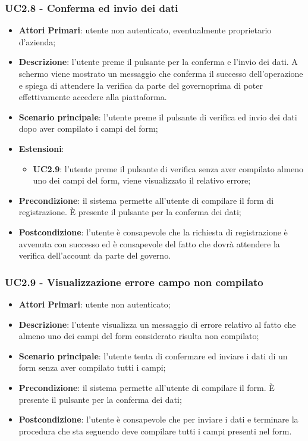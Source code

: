 \subsubsection{UC2.8 - Conferma ed invio dei dati}
\begin{itemize}
	\item \textbf{Attori Primari}: utente non autenticato, eventualmente proprietario d'azienda;
	\item \textbf{Descrizione}:
	l'utente preme il pulsante per la conferma e l'invio dei dati. A schermo viene mostrato un messaggio che conferma il successo dell'operazione e spiega di attendere la verifica da parte del governo\glosp prima di poter effettivamente accedere alla piattaforma.
	\item \textbf{Scenario principale}: l'utente preme il pulsante di verifica ed invio dei dati dopo aver compilato i campi del form;
	\item \textbf{Estensioni}: 
	\begin{itemize}
		\item \textbf{UC2.9}: l'utente preme il pulsante di verifica senza aver compilato almeno uno dei campi del form, viene visualizzato il relativo errore;
	\end{itemize}
	\item \textbf{Precondizione}: il sistema permette all'utente di compilare il form di registrazione. \`E presente il pulsante per la conferma dei dati;
	\item \textbf{Postcondizione}:
	l'utente è consapevole che la richiesta di registrazione è avvenuta con successo ed è consapevole del fatto che dovrà attendere la verifica dell'account da parte del governo\glosp.
\end{itemize}

\subsubsection{UC2.9 - Visualizzazione errore campo non compilato}
\begin{itemize}
	\item \textbf{Attori Primari}: utente non autenticato;
	\item \textbf{Descrizione}:
	l'utente visualizza un messaggio di errore relativo al fatto che almeno uno dei campi del form considerato risulta non compilato;
	\item \textbf{Scenario principale}: l'utente tenta di confermare ed inviare i dati di un form senza aver compilato tutti i campi;
	\item \textbf{Precondizione}: il sistema permette all'utente di compilare il form. \`E presente il pulsante per la conferma dei dati;
	\item \textbf{Postcondizione}:
	l'utente è consapevole che per inviare i dati e terminare la procedura che sta seguendo deve compilare tutti i campi presenti nel form.
\end{itemize}
